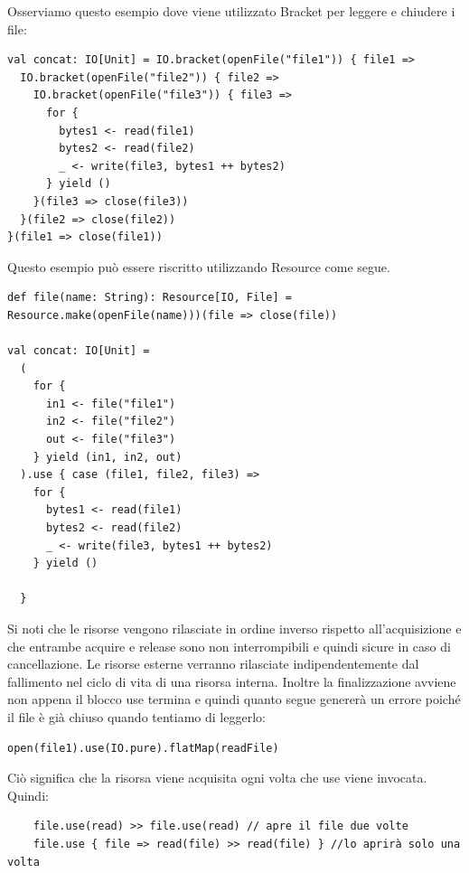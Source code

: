\noindent Osserviamo questo esempio dove viene utilizzato Bracket per leggere e chiudere i file:
\begin{verbatim}
val concat: IO[Unit] = IO.bracket(openFile("file1")) { file1 =>
  IO.bracket(openFile("file2")) { file2 =>
    IO.bracket(openFile("file3")) { file3 =>
      for {
        bytes1 <- read(file1)
        bytes2 <- read(file2)
        _ <- write(file3, bytes1 ++ bytes2)
      } yield ()
    }(file3 => close(file3))
  }(file2 => close(file2))
}(file1 => close(file1))
\end{verbatim}

\noindent Questo esempio può essere riscritto utilizzando Resource come segue.

\begin{verbatim}
def file(name: String): Resource[IO, File] = Resource.make(openFile(name)))(file => close(file))

val concat: IO[Unit] =
  (
    for {
      in1 <- file("file1")
      in2 <- file("file2")
      out <- file("file3")
    } yield (in1, in2, out)
  ).use { case (file1, file2, file3) =>
    for {
      bytes1 <- read(file1)
      bytes2 <- read(file2)
      _ <- write(file3, bytes1 ++ bytes2)
    } yield ()
  
  }
\end{verbatim}

\noindent Si noti che le risorse vengono rilasciate in ordine inverso rispetto all'acquisizione e che entrambe acquire e release sono non interrompibili e quindi sicure in caso di cancellazione. Le risorse esterne verranno rilasciate indipendentemente dal fallimento nel ciclo di vita di una risorsa interna. Inoltre la finalizzazione avviene non appena il blocco use termina e quindi quanto segue genererà un errore poiché il file è già chiuso quando tentiamo di leggerlo:
\begin{verbatim}
open(file1).use(IO.pure).flatMap(readFile)
\end{verbatim}
\noindent Ciò significa che la risorsa viene acquisita ogni volta che use viene invocata. Quindi:
\begin{verbatim}
    file.use(read) >> file.use(read) // apre il file due volte
    file.use { file => read(file) >> read(file) } //lo aprirà solo una volta
\end{verbatim}